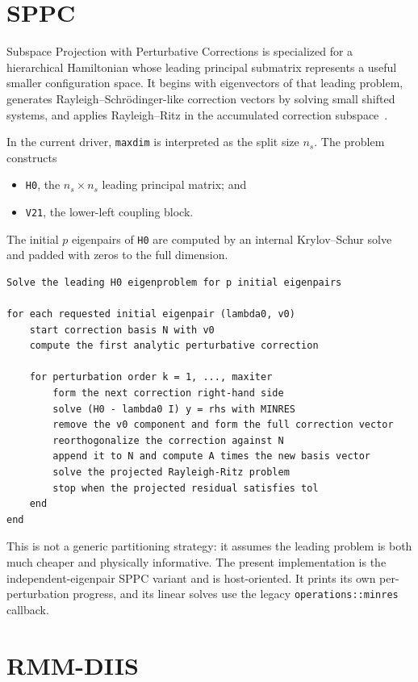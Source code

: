 \documentclass[11pt]{article}
\newcommand{\code}[1]{\texttt{#1}}
\begin{document}
\section{SPPC}
\label{sec:sppc}

Subspace Projection with Perturbative Corrections is specialized for a
hierarchical Hamiltonian whose leading principal submatrix represents a useful
smaller configuration space.  It begins with eigenvectors of that leading
problem, generates Rayleigh--Schr\"odinger-like correction vectors by solving
small shifted systems, and applies Rayleigh--Ritz in the accumulated correction
subspace~\cite{sppc}.

In the current driver, \code{maxdim} is interpreted as the split size $n_s$.
The problem constructs
\begin{itemize}[leftmargin=*]
  \item \code{H0}, the $n_s\times n_s$ leading principal matrix; and
  \item \code{V21}, the lower-left coupling block.
\end{itemize}
The initial $p$ eigenpairs of \code{H0} are computed by an internal
Krylov--Schur solve and padded with zeros to the full dimension.

\begin{lstlisting}
Solve the leading H0 eigenproblem for p initial eigenpairs

for each requested initial eigenpair (lambda0, v0)
    start correction basis N with v0
    compute the first analytic perturbative correction

    for perturbation order k = 1, ..., maxiter
        form the next correction right-hand side
        solve (H0 - lambda0 I) y = rhs with MINRES
        remove the v0 component and form the full correction vector
        reorthogonalize the correction against N
        append it to N and compute A times the new basis vector
        solve the projected Rayleigh-Ritz problem
        stop when the projected residual satisfies tol
    end
end
\end{lstlisting}

This is not a generic partitioning strategy: it assumes the leading problem is
both much cheaper and physically informative.  The present implementation is
the independent-eigenpair SPPC variant and is host-oriented.  It prints its own
per-perturbation progress, and its linear solves use the legacy
\code{operations::minres} callback.

\section{RMM-DIIS}
\label{sec:rmm-diis}
\end{document}
